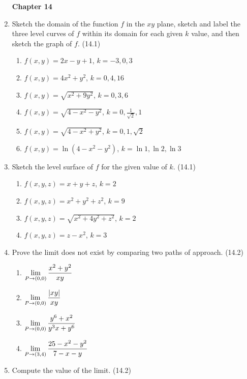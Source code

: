 \begin{enumerate}
\newpage
\centerline{\bf Chapter 14}

    \item Sketch the domain of the function $f$ in the $xy$ plane, sketch and label the three level curves of $f$ within its domain for each given $k$ value, and then sketch the graph of $f$. (14.1)

      \begin{enumerate}
        \item $f(x,y)=2x-y+1$, $k=-3,0,3$
        \item $f(x,y)=4x^2+y^2$, $k=0,4,16$
        \item $f(x,y)=\sqrt{x^2+9y^2}$, $k=0,3,6$
        \item $f(x,y)=\sqrt{4-x^2-y^2}$, $k=0,\frac{1}{\sqrt{2}},1$
        \item $f(x,y)=\sqrt{4-x^2+y^2}$, $k=0,1,\sqrt{2}$
        \item $f(x,y)=\ln(4-x^2-y^2)$, $k=\ln1,\ln2,\ln3$
      \end{enumerate}

    \item Sketch the level surface of $f$ for the given value of $k$. (14.1)

      \begin{enumerate}
        \item $f(x,y,z)=x+y+z$, $k=2$
        \item $f(x,y,z)=x^2+y^2+z^2$, $k=9$
        \item $f(x,y,z)=\sqrt{x^2+4y^2+z^2}$, $k=2$
        \item $f(x,y,z)=z-x^2$, $k=3$
      \end{enumerate}

    \item Prove the limit does not exist by comparing two paths of approach. (14.2)

      \begin{enumerate}
        \item $\displaystyle \lim_{P\to(0,0)} \frac{x^2+y^2}{xy}$
        \item $\displaystyle \lim_{P\to(0,0)} \frac{|xy|}{xy}$
        \item $\displaystyle \lim_{P\to(0,0)} \frac{y^6+x^2}{y^3x+y^6}$
        \item $\displaystyle \lim_{P\to(3,4)} \frac{25-x^2-y^2}{7-x-y}$
      \end{enumerate}

    \newpage

    \item Compute the value of the limit. (14.2)


\end{enumerate}
